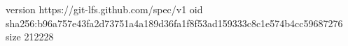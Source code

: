 version https://git-lfs.github.com/spec/v1
oid sha256:b96a757e43fa2d73751a4a189d36fa1f8f53ad159333c8c1e574b4cc59687276
size 212228
